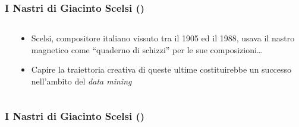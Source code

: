 \setcounter{ms}{0}
\begin{frame}
    \frametitle<+- | alert@+->{I Nastri di Giacinto Scelsi ()}
    
    \begin{columns}[T]
        \begin{column}{0.3\textwidth}
        \end{column}
        \begin{column}{0.7\textwidth}
            \begin{itemize}[<+- | alert@+->]
                \item Scelsi, compositore italiano vissuto tra il 1905 ed il
                    1988, usava il nastro magnetico come
                    ``quaderno di schizzi'' per le sue composizioni\dots
                \item Capire la traiettoria creativa di queste ultime
                    costituirebbe un successo nell'ambito del \emph{data
                    mining}
            \end{itemize}
        \end{column}
    \end{columns}

\end{frame}

\begin{frame}
    \frametitle{I Nastri di Giacinto Scelsi ()}
    
    \begin{center}
    \end{center}

\end{frame}

